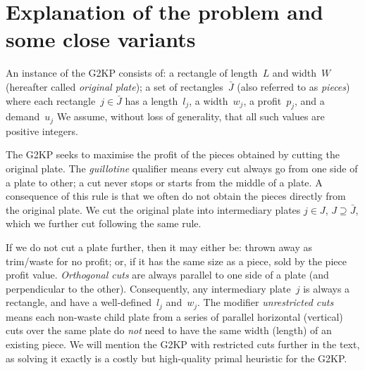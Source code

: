 \documentclass[ppgc,prop-tese,english,formais,babel]{iiufrgs}
\begin{document}
\begin{comment}
\begin{table}[h]
    \caption{Uma tabela de Exemplo}
    \begin{center}
        \begin{tabular}{c|c|p{5cm}}
            \textit{Col 1}  &   \textit{Col 2}  &   \textit{Col 3} \\
            \hline
            \hline
            Val 1           &   Val 2           & Esta coluna funciona como um parágrafo, tendo uma margem definida em 5cm. Quebras de linha funcionam como em qualquer parágrafo do tex. \\
            Valor Longo     & Val 2             & Val 3 \\
            \hline
        \end{tabular}
    \end{center}
    \legend{Fonte: Os Autores}
    \label{tbl:ex1}
\end{table}
\end{comment}

\section{Explanation of the problem and some close variants}

An instance of the G2KP consists of: a rectangle of length~\(L\) and width~\(W\) (hereafter called \emph{original plate}); a set of rectangles~\(\bar{J}\) (also referred to as \emph{pieces}) where each rectangle~\(j \in \bar{J}\) has a length~\(l_j\), a width~\(w_j\), a profit~\(p_j\), and a demand~\(u_j\)
We assume, without loss of generality, that all such values are positive integers.

The G2KP seeks to maximise the profit of the pieces obtained by cutting the original plate.
The \emph{guillotine} qualifier means every cut always go from one side of a plate to other; a cut never stops or starts from the middle of a plate.
A consequence of this rule is that we often do not obtain the pieces directly from the original plate.
We cut the original plate into intermediary plates \(j \in J\), \(J \supseteq \bar{J}\), which we further cut following the same rule.

If we do not cut a plate further, then it may either be: thrown away as trim/waste for no profit; or, if it has the same size as a piece, sold by the piece profit value.
\emph{Orthogonal cuts} are always parallel to one side of a plate (and perpendicular to the other).
Consequently, any intermediary plate~\(j\) is always a rectangle, and have a well-defined~\(l_j\) and~\(w_j\).
The modifier \emph{unrestricted cuts} means each non-waste child plate from a series of parallel horizontal (vertical) cuts over the same plate do \emph{not} need to have the same width (length) of an existing piece.
We will mention the G2KP with restricted cuts further in the text, as solving it exactly is a costly but high-quality primal heuristic for the G2KP.
\end{document}
